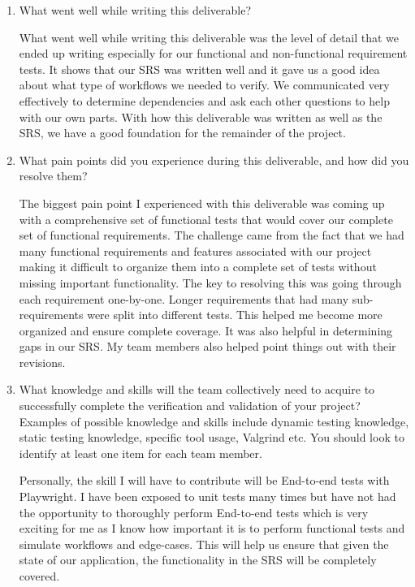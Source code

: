 \documentclass[12pt, titlepage]{article}
\begin{document}
\begin{enumerate}
  \item What went well while writing this deliverable?

  What went well while writing this deliverable was the level of detail that we ended up
  writing especially for our functional and non-functional requirement tests. It shows that
  our SRS was written well and it gave us a good idea about what type of workflows we needed
  to verify. We communicated very effectively to determine dependencies and ask each other
  questions to help with our own parts. With how this deliverable was written as well as 
  the SRS, we have a good foundation for the remainder of the project.

  \item What pain points did you experience during this deliverable, and how
      did you resolve them?

  The biggest pain point I experienced with this deliverable was coming up with a comprehensive
  set of functional tests that would cover our complete set of functional requirements. The
  challenge came from the fact that we had many functional requirements and features associated
  with our project making it difficult to organize them into a complete set of tests without
  missing important functionality. The key to resolving this was going through each requirement
  one-by-one. Longer requirements that had many sub-requirements were split into different 
  tests. This helped me become more organized and ensure complete coverage. It was also helpful
  in determining gaps in our SRS. My team members also helped point things out with their revisions.

  \item What knowledge and skills will the team collectively need to acquire to
  successfully complete the verification and validation of your project?
  Examples of possible knowledge and skills include dynamic testing knowledge,
  static testing knowledge, specific tool usage, Valgrind etc.  You should look to
  identify at least one item for each team member.

  Personally, the skill I will have to contribute will be End-to-end tests with Playwright.
  I have been exposed to unit tests many times but have not had the opportunity to thoroughly
  perform End-to-end tests which is very exciting for me as I know how important it is to 
  perform functional tests and simulate workflows and edge-cases. This will help us ensure 
  that given the state of our application, the functionality in the SRS will be completely covered.


\end{enumerate}
\end{document}
